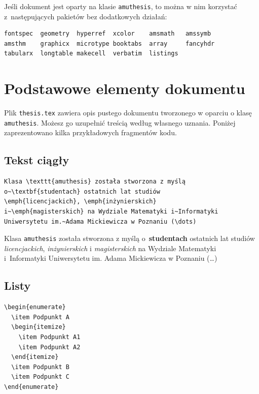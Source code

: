 \documentclass[oneside]{amuthesis}
\begin{document}
Jeśli dokument jest oparty na klasie \texttt{amuthesis}, to można w nim korzystać z~następujących pakietów bez dodatkowych działań:

\begin{verbatim}
fontspec  geometry  hyperref  xcolor    amsmath   amssymb
amsthm    graphicx  microtype booktabs  array     fancyhdr
tabularx  longtable makecell  verbatim  listings
\end{verbatim}

\chapter{Podstawowe elementy dokumentu}

Plik \texttt{thesis.tex} zawiera opis pustego dokumentu tworzonego w oparciu o klasę \texttt{amuthesis}. Możesz go uzupełnić treścią według własnego uznania. Poniżej zaprezentowano kilka przykładowych fragmentów kodu.

\section{Tekst ciągły}

\begin{verbatim}
Klasa \texttt{amuthesis} została stworzona z myślą
o~\textbf{studentach} ostatnich lat studiów
\emph{licencjackich}, \emph{inżynierskich}
i~\emph{magisterskich} na Wydziale Matematyki i~Informatyki
Uniwersytetu im.~Adama Mickiewicza w Poznaniu (\dots)
\end{verbatim}

\noindent Klasa \texttt{amuthesis} została stworzona z myślą
o~\textbf{studentach} ostatnich lat studiów
\emph{licencjackich}, \emph{inżynierskich} i
\emph{magisterskich} na Wydziale Matematyki i~Informatyki
Uniwersytetu im. Adama Mickiewicza w Poznaniu (\dots)

\section{Listy}

\begin{verbatim}
\begin{enumerate}
  \item Podpunkt A
  \begin{itemize}
    \item Podpunkt A1
    \item Podpunkt A2
  \end{itemize}
  \item Podpunkt B
  \item Podpunkt C
\end{enumerate}
\end{verbatim}
\end{document}
